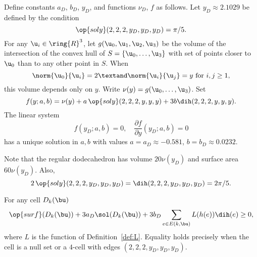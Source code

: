 \begin{definition}[$a_D$,~$b_D$,~$y_D$,~$\nu_D$,~$f$]
  Define constants $a_D$, $b_D$, $y_D$, and functions $\nu_D$, $f$ as
  follows.  Let $y_D\approx 2.1029$ be defined by the condition
\[
\op{soly}(2,2,2,y_D,y_D,y_D) = \pi/5.
\]
For any $\u_i\in\ring{R}^3$, let $g(\u_0,\u_1,\u_2,\u_3)$ be the
volume of the intersection of the convex hull of
$S=\{\u_0,\ldots,\u_3\}$ with set of points closer to $ \u_0$ than to
any other point in $S$.  When
\begin{equation}\label{eqn:uy}
  \norm{\u_0}{\u_i}=2\textand \norm{ \u_i}{ \u_j} = y\text{ for }i,j\ge 1,
\end{equation} 
this volume depends only on $y$. Write $\nu(y) = g(\u_0,\ldots,\u_3)$.
Set
\[
  f(y;a,b) = \nu(y) +  a\, \op{soly}(2,2,2,y,y,y) + 3 b \dih(2,2,2,y,y,y).
\]
The linear system
\begin{equation}\label{eqn:fyD}
f(y_D;a,b) = 0,\quad \dfrac{\partial f}{\partial y}(y_D;a,b) = 0
\end{equation}
has a unique solution in $a,b$ with values $a=a_D\approx -0.581$,
$b=b_D\approx 0.0232$.
\end{definition}
%
%
%
%
%
%

Note that the regular dodecahedron has volume $20 \nu(y_D)$ and surface
area $60 \nu(y_D)$.  Also,
\begin{equation}
  2\,\op{soly}(2,2,2,y_D,y_D,y_D) =\dih(2,2,2,y_D,y_D,y_D)=2\pi/5.
\end{equation}
%
%

\begin{lemma}\label{lemma:D-local}
For any cell $D_k(\bu)$
\[
  \op{surf}(D_k(\bu)) + 3 a_D \sol(D_k(\bu)) 
+ 3 b_D \sum_{e\in E(k,\bu)} L(h(e)) \dih(e) \ge 0,
\]
where $L$ is the function of Definition~\ref{def:L}.  Equality holds
precisely when the cell is a null set or a $4$-cell with edges
$(2,2,2,y_D,y_D,y_D)$.
\end{lemma}
%



